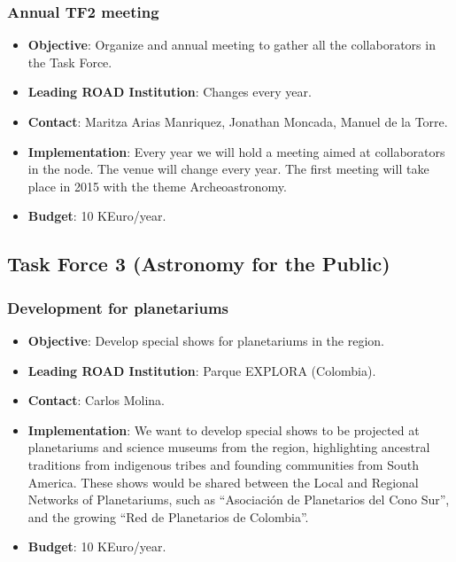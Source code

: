 \documentclass[12pt]{article}
\begin{document}
\subsubsection{Annual TF2 meeting}
\begin{itemize}
\item {\bf Objective}:  Organize and annual meeting to gather all the
  collaborators in the Task Force.
\item {\bf Leading ROAD Institution}: Changes every year.
\item {\bf Contact}: Maritza Arias Manriquez, Jonathan Moncada,  Manuel
  de la Torre.
\item {\bf Implementation}: 
Every year we will hold a meeting aimed at collaborators in the
node. The venue will change every year. The first meeting will take
place in 2015 with the theme Archeoastronomy.
\item {\bf Budget}: 10 KEuro/year.
\end{itemize}




\subsection{Task Force 3 (Astronomy for the Public)}


\subsubsection{Development for planetariums}
\begin{itemize}
\item {\bf Objective}: Develop special shows for planetariums in the
  region. 
\item {\bf Leading ROAD Institution}: Parque EXPLORA (Colombia).
\item {\bf Contact}: Carlos Molina.
\item {\bf Implementation}: We want to develop special shows to be projected
  at planetariums and science museums from the region, highlighting
  ancestral traditions from indigenous tribes and founding communities
  from South America. These shows would be shared between the Local
  and Regional Networks of Planetariums, such as “Asociación de
  Planetarios del Cono Sur”, and the growing “Red de Planetarios de
  Colombia”.   
\item {\bf Budget}: 10 KEuro/year.
\end{itemize}
\end{document}
